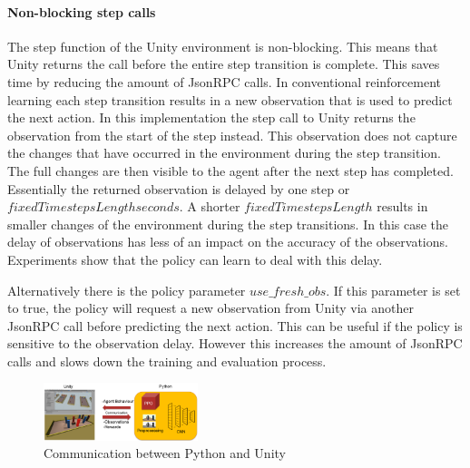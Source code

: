 \paragraph{Non-blocking step calls}
\label{sec:non_blocking_step_calls}

The step function of the Unity environment is non-blocking. This means that Unity returns the call before the entire step transition is complete. This saves time by reducing the amount of JsonRPC calls. In conventional reinforcement learning each step transition results in a new observation that is used to predict the next action. In this implementation the step call to Unity returns the observation from the start of the step instead. This observation does not capture the changes that have occurred in the environment during the step transition. The full changes are then visible to the agent after the next step has completed. Essentially the returned observation is delayed by one step or $fixedTimestepsLength seconds$. A shorter $fixedTimestepsLength$ results in smaller changes of the environment during the step transitions. In this case the delay of observations has less of an impact on the accuracy of the observations.
Experiments show that the policy can learn to deal with this delay.

Alternatively there is the policy parameter $use\_fresh\_obs$. If this parameter is set to true, the policy will request a new observation from Unity via another JsonRPC call before predicting the next action. This can be useful if the policy is sensitive to the observation delay. However this increases the amount of JsonRPC calls and slows down the training and evaluation process.




\begin{figure}
    \centering
    \includegraphics[width=0.4\textwidth]{Bilder/unity_communication.png}
    \caption{Communication between Python and Unity}
    \label{fig:communication_python_unity}
\end{figure} %



